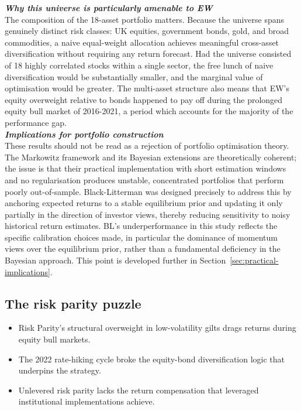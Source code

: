 \documentclass[a4paper,alpha-refs]{scr-contemporary}
\numberwithin{equation}{section}
\begin{document}
\noindent\textbf{\emph{Why this universe is particularly amenable to EW}} \\
\indent The composition of the 18-asset portfolio matters. Because the universe spans
genuinely distinct risk classes: UK equities, government bonds, gold, and broad
commodities, a naive equal-weight allocation achieves meaningful cross-asset
diversification without requiring any return forecast. \newline
\indent Had the universe consisted of
18 highly correlated stocks within a single sector, the free lunch of naive diversification
would be substantially smaller, and the marginal value of optimisation would be greater.
\indent The multi-asset structure also means that EW's equity overweight relative to bonds
happened to pay off during the prolonged equity bull market of 2016-2021, a period
which accounts for the majority of the performance gap. \\

\noindent\textbf{\emph{Implications for portfolio construction}} \\
\indent These results should not be read as a rejection of portfolio optimisation theory.
The Markowitz framework and its Bayesian extensions are theoretically coherent; the issue
is that their practical implementation with short estimation windows and no regularisation
produces unstable, concentrated portfolios that perform poorly out-of-sample. \newline
\indent Black-Litterman was designed precisely to address this by anchoring expected 
returns to a stable equilibrium prior and updating it only partially in the direction 
of investor views, thereby reducing sensitivity to noisy historical return estimates. 
BL's underperformance in this study reflects the specific calibration
choices made, in particular the dominance of momentum views over the equilibrium prior,
rather than a fundamental deficiency in the Bayesian approach.
This point is developed further in Section~\ref{sec:practical-implications}.

\subsection{The risk parity puzzle}
\label{sec:rp-puzzle}

\begin{keypoints*}
\begin{itemize}
  \item Risk Parity's structural overweight in low-volatility gilts drags returns during equity bull markets.
  \item The 2022 rate-hiking cycle broke the equity-bond diversification logic that underpins the strategy.
  \item Unlevered risk parity lacks the return compensation that leveraged institutional implementations achieve.
\end{itemize}
\end{keypoints*}
\end{document}
